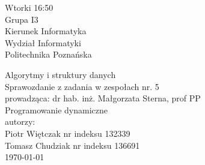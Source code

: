 \documentclass[polish,polish,a4paper]{article}
\begin{document}
	
		\begin{titlepage}
			\begin{flushright}
				{ Wtorki 16:50\\
					Grupa I3\\
					Kierunek Informatyka\\
					Wydział Informatyki\\
					Politechnika Poznańska}
			\end{flushright}
		\vspace*{\fill}
		\begin{center}
			{\Large Algorytmy i struktury danych \\[0.1cm]
				Sprawozdanie z zadania w zespołach nr. 5\\[0.1cm]
				prowadząca: dr hab. inż. Małgorzata Sterna, prof PP}\\
			{\Huge Programowanie dynamiczne\\ [0.4cm]}
			{\large autorzy:\\[0.1cm]}
			{\large Piotr Więtczak nr indeksu 132339\\[0.1cm] Tomasz Chudziak nr indeksu 136691}\\[0.5cm]
			\today
		\end{center}
		\vspace*{\fill}
	\end{titlepage}
\end{document}

